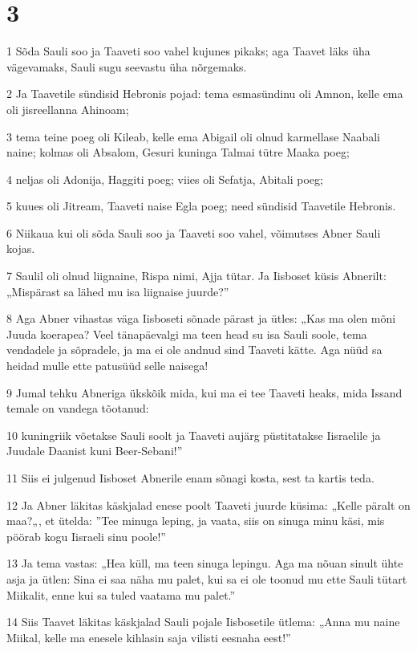 \chapter{3}

\par 1 Sõda Sauli soo ja Taaveti soo vahel kujunes pikaks; aga Taavet läks üha vägevamaks, Sauli sugu seevastu üha nõrgemaks.
\par 2 Ja Taavetile sündisid Hebronis pojad: tema esmasündinu oli Amnon, kelle ema oli jisreellanna Ahinoam;
\par 3 tema teine poeg oli Kileab, kelle ema Abigail oli olnud karmellase Naabali naine; kolmas oli Absalom, Gesuri kuninga Talmai tütre Maaka poeg;
\par 4 neljas oli Adonija, Haggiti poeg; viies oli Sefatja, Abitali poeg;
\par 5 kuues oli Jitream, Taaveti naise Egla poeg; need sündisid Taavetile Hebronis.
\par 6 Niikaua kui oli sõda Sauli soo ja Taaveti soo vahel, võimutses Abner Sauli kojas.
\par 7 Saulil oli olnud liignaine, Rispa nimi, Ajja tütar. Ja Iisboset küsis Abnerilt: „Mispärast sa lähed mu isa liignaise juurde?”
\par 8 Aga Abner vihastas väga Iisboseti sõnade pärast ja ütles: „Kas ma olen mõni Juuda koerapea? Veel tänapäevalgi ma teen head su isa Sauli soole, tema vendadele ja sõpradele, ja ma ei ole andnud sind Taaveti kätte. Aga nüüd sa heidad mulle ette patusüüd selle naisega!
\par 9 Jumal tehku Abneriga ükskõik mida, kui ma ei tee Taaveti heaks, mida Issand temale on vandega tõotanud:
\par 10 kuningriik võetakse Sauli soolt ja Taaveti aujärg püstitatakse Iisraelile ja Juudale Daanist kuni Beer-Sebani!”
\par 11 Siis ei julgenud Iisboset Abnerile enam sõnagi kosta, sest ta kartis teda.
\par 12 Ja Abner läkitas käskjalad enese poolt Taaveti juurde küsima: „Kelle päralt on maa?„, et ütelda: ”Tee minuga leping, ja vaata, siis on sinuga minu käsi, mis pöörab kogu Iisraeli sinu poole!”
\par 13 Ja tema vastas: „Hea küll, ma teen sinuga lepingu. Aga ma nõuan sinult ühte asja ja ütlen: Sina ei saa näha mu palet, kui sa ei ole toonud mu ette Sauli tütart Miikalit, enne kui sa tuled vaatama mu palet.”
\par 14 Siis Taavet läkitas käskjalad Sauli pojale Iisbosetile ütlema: „Anna mu naine Miikal, kelle ma enesele kihlasin saja vilisti eesnaha eest!”

